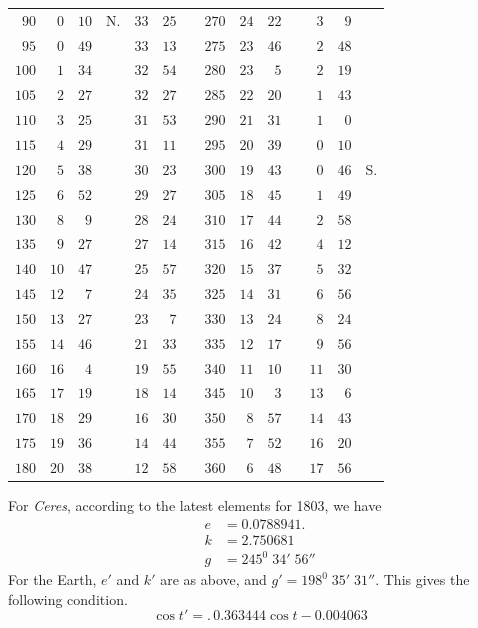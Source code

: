 \begin{center}
\begin{tabular}{r|rrl|rrl||r|rrl|rrl}
$90$&$0$&$10$&N.&$33$&$25$&&$270$&$24$&$22$&&$3$&$9$&\\[3pt]
$95$&$0$&$49$&&$33$&$13$&&$275$&$23$&$46$&&$2$&$48$&\\
$100$&$1$&$34$&&$32$&$54$&&$280$&$23$&$5$&&$2$&$19$&\\
$105$&$2$&$27$&&$32$&$27$&&$285$&$22$&$20$&&$1$&$43$&\\
$110$&$3$&$25$&&$31$&$53$&&$290$&$21$&$31$&&$1$&$0$&\\
$115$&$4$&$29$&&$31$&$11$&&$295$&$20$&$39$&&$0$&$10$&\\
$120$&$5$&$38$&&$30$&$23$&&$300$&$19$&$43$&&$0$&$46$&S.\\[3pt]
$125$&$6$&$52$&&$29$&$27$&&$305$&$18$&$45$&&$1$&$49$&\\
$130$&$8$&$9$&&$28$&$24$&&$310$&$17$&$44$&&$2$&$58$&\\
$135$&$9$&$27$&&$27$&$14$&&$315$&$16$&$42$&&$4$&$12$&\\
$140$&$10$&$47$&&$25$&$57$&&$320$&$15$&$37$&&$5$&$32$&\\
$145$&$12$&$7$&&$24$&$35$&&$325$&$14$&$31$&&$6$&$56$&\\
$150$&$13$&$27$&&$23$&$7$&&$330$&$13$&$24$&&$8$&$24$&\\[3pt]
$155$&$14$&$46$&&$21$&$33$&&$335$&$12$&$17$&&$9$&$56$&\\
$160$&$16$&$4$&&$19$&$55$&&$340$&$11$&$10$&&$11$&$30$&\\
$165$&$17$&$19$&&$18$&$14$&&$345$&$10$&$3$&&$13$&$6$&\\
$170$&$18$&$29$&&$16$&$30$&&$350$&$8$&$57$&&$14$&$43$&\\
$175$&$19$&$36$&&$14$&$44$&&$355$&$7$&$52$&&$16$&$20$&\\
$180$&$20$&$38$&&$12$&$58$&&$360$&$6$&$48$&&$17$&$56$&
\end{tabular}
\endgroup
\end{center}

For \textit{Ceres}, according to the latest elements for 1803, we have
\[
\begin{aligned}
e&=0.0788941.\\
k&=2.750681\\
g&=245^0\;34'\;56''
\end{aligned}
\]
For the Earth, $e'$ and $k'$ are as above, and $g'=198^0\;35'\;31''$.
This gives the following condition.
\[
\cos t'=.\,0.363444\cos t-0.004063
\]


